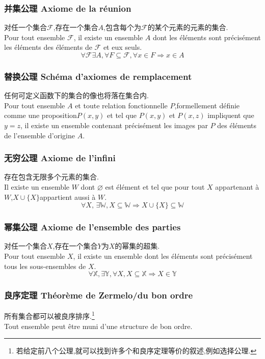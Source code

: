 \documentclass[12pt, a4paper, oneside]{ctexbook}
\begin{document}
      \subsubsection{并集公理 Axiome de la réunion}
      对任一个集合$\mathcal{F}$,存在一个集合$A$,包含每个为$\mathcal{F}$的某个元素的元素的集合.\\\indent
      Pour tout ensemble $\mathcal{F}$, il existe un ensemble $A$ dont les éléments sont précisément les éléments des éléments de $\mathcal{F}$ et eux seuls.
      $$
      \forall \mathcal{F}\exists A,\forall F\subseteq\mathcal{F},\forall x\in F\Rightarrow x\in A 
      $$


      \subsubsection{替换公理 Schéma d'axiomes de remplacement}
      任何可定义函数下的集合的像也将落在集合内.\\\indent
      Pour tout ensemble $A$ et toute relation fonctionnelle $P$,formellement définie comme une proposition$P(x,y)$ et tel que $P(x,y)$ et $P(x,z)$ 
      impliquent que $y=z$, il existe un ensemble contenant précisément les images par $P$ des éléments de l'ensemble d'origine $A$.


      \subsubsection{无穷公理 Axiome de l'infini}
      存在包含无限多个元素的集合.\\\indent
      Il existe un ensemble $W$ dont $\varnothing$ est élément et tel que pour tout $X$ appartenant à $W$,$X\cup\{X\}$appartient aussi à $W$.
      $$
      \forall X,\, \exists \mathbb{W}, X\subseteq \mathbb{W}\Rightarrow X\cup \{X\}\subseteq \mathbb{W}
      $$


      \subsubsection{幂集公理 Axiome de l'ensemble des parties}
      对任一个集合$X$,存在一个集合$Y$为$X$的幂集的超集.\\\indent
      Pour tout ensemble $X$, il existe un ensemble dont les éléments sont précisément tous les sous-ensembles de $X$.
      $$
      \forall \mathbb{X},\exists \mathbb{Y},\forall X, X\subseteq \mathbb{X}\Rightarrow X\in\mathbb{Y}
      $$


      \subsubsection{良序定理 Théorème de Zermelo/du bon ordre}
      所有集合都可以被良序排序.\footnote{若给定前八个公理,就可以找到许多个和良序定理等价的叙述,例如选择公理.}\\\indent
      Tout ensemble peut être muni d'une structure de bon ordre.
\end{document}
